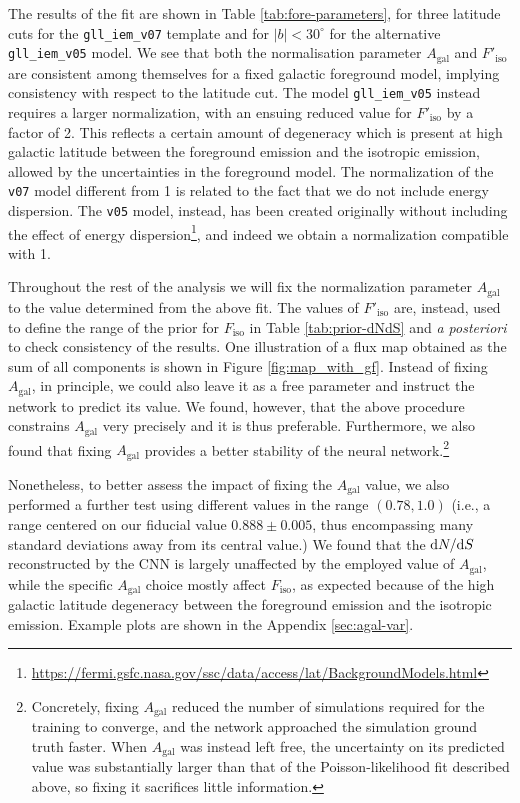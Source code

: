 The results of the fit are shown in Table \ref{tab:fore-parameters}, for three latitude cuts for the \verb|gll_iem_v07| template and for $|b|<30^\circ$ for the alternative \verb|gll_iem_v05| model. We see that both the normalisation parameter $A_\textrm{gal}$ and $F'_\textrm{iso}$ are consistent among themselves for a fixed galactic foreground model, implying consistency with respect to the latitude cut. The model \verb|gll_iem_v05| instead requires a larger normalization, with an ensuing reduced value for $F'_\textrm{iso}$ by a factor of 2.
This reflects a certain amount of degeneracy which is present at high galactic latitude between the foreground emission and the isotropic emission, allowed by the uncertainties in the foreground model.
The normalization of the \verb|v07| model different from 1 is related to the fact that we do not include energy dispersion. The \verb|v05| model, instead, has been created originally without including the effect of energy dispersion\footnote{\url{https://fermi.gsfc.nasa.gov/ssc/data/access/lat/BackgroundModels.html}}, and indeed we obtain a normalization compatible with 1.


Throughout the rest of the analysis we will fix the normalization parameter $A_\textrm{gal}$ to the value determined from the above fit. The values of $F'_\textrm{iso}$ are, instead, used to define the range of the prior for $F_\textrm{iso}$ in Table \ref{tab:prior-dNdS} and \textsl{a posteriori} to check consistency of the results.
%
One illustration of a flux map obtained as the sum of all components is shown in Figure \ref{fig:map_with_gf}.
Instead of fixing $A_\textrm{gal}$, in principle, we could also leave it as a free parameter and instruct the network to predict its value. We found, however, that the above procedure constrains $A_\textrm{gal}$ very precisely and it is thus preferable. Furthermore, we also found that fixing $A_\textrm{gal}$ provides a better stability of the neural network.\footnote{Concretely, fixing $A_\textrm{gal}$ reduced the number of simulations required for the training to converge, and the network approached the simulation ground truth faster. When $A_\textrm{gal}$ was instead left free, the uncertainty on its predicted value was substantially larger than that of the Poisson-likelihood fit described above, so fixing it sacrifices little information.}

{  Nonetheless, to better assess the impact of fixing the $A_\textrm{gal}$ value, we also performed a further test using different values in the range $(0.78, 1.0)$ (i.e., a range centered on our fiducial value $0.888 \pm 0.005$, thus encompassing many standard deviations away from its central value.)
We found that the $\text{d}N/\text{d}S$ reconstructed by the CNN is largely unaffected by the employed value of $A_\textrm{gal}$, while 
the specific $A_\textrm{gal}$ choice mostly affect $F_\textrm{iso}$,
as expected because of the  high galactic latitude degeneracy between the foreground emission and the isotropic emission. 
Example plots are shown in the Appendix \ref{sec:agal-var}.}





